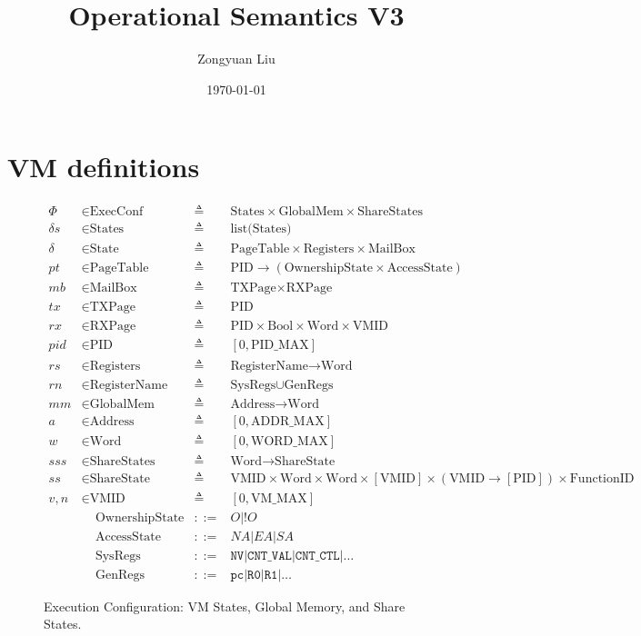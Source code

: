\documentclass[a4paper]{article}
\title{Operational Semantics V3} \date{\today}
\author{Zongyuan Liu}
\let\Oldsection\section
\renewcommand{\section}{\FloatBarrier\Oldsection}
\newcommand*{\defined}{\triangleq}
\newcommand*{\maps}{\rightarrow}
\newcommand*{\derived}{::=}
\newcommand*{\CONF}{\text{ExecConf}}
\newcommand*{\STATE}{\text{State}}
\newcommand*{\MEM}{\text{GlobalMem}}
\newcommand*{\SSS}{\text{ShareStates}}
\newcommand*{\PID}{\text{PID}}
\newcommand*{\PT}{\text{PageTable}}
\newcommand*{\AS}{\text{AccessState}}
\newcommand*{\OS}{\text{OwnershipState}}
\newcommand*{\REGS}{\text{Registers}}
\newcommand*{\ADDR}{\text{Address}}
\newcommand*{\WORD}{\text{Word}}
\newcommand*{\VMID}{\text{VMID}}
\newcommand*{\REGNAMES}{\text{RegisterName}}
\newcommand*{\MB}{\text{MailBox}}
\newcommand*{\PAMAX}{\text{ADDR\_MAX}}
\newcommand*{\PPIDMAX}{\text{PID\_MAX}}
\newcommand*{\PWMAX}{\text{WORD\_MAX}}
\newcommand*{\PVMMAX}{\text{VM\_MAX}}
\begin{document}

\tableofcontents

\section{VM definitions}

\begin{figure}[!htb]
  \begin{align*}
    \Phi &\in \CONF &\defined &\text{States} \times \MEM \times \SSS \\
    \delta s &\in \text{States} &\defined &\text{list(States)} \\
    \delta &\in \STATE &\defined &\PT \times \REGS \times \MB \\
    pt & \in \PT & \defined & \PID \maps (\OS \times \AS) \\
    mb & \in \MB &\defined &\text{TXPage} \times  \text{RXPage}\\
    tx & \in \text{TXPage} &\defined &\PID\\
    rx & \in \text{RXPage} &\defined &\PID \times \text{Bool} \times \WORD \times \VMID \\
    pid & \in \PID &\defined  &[ 0, \PPIDMAX ] \\
    rs & \in \REGS &\defined  &\REGNAMES \maps \WORD \\
    rn & \in \REGNAMES &\defined &\text{SysRegs} \cup \text{GenRegs} \\
    mm & \in \MEM &\defined  &\ADDR \maps \WORD \\
    a & \in \ADDR &\defined  &[ 0, \PAMAX ] \\
    w & \in \WORD &\defined  &[ 0, \PWMAX ] \\
    sss & \in \SSS &\defined  &\WORD \maps \text{ShareState} \\
    ss & \in \text{ShareState} &\defined &\VMID \times \WORD \times \WORD \times [\VMID] \times (\VMID \maps [\PID]) \times \text{FunctionID}\\
    v,n & \in \VMID &\defined  &[ 0, \PVMMAX ] \\
      & \;\;\;\; \OS & \derived & O | !O \\
      & \;\;\;\; \AS & \derived & NA | EA | SA \\
      & \;\;\;\; \text{SysRegs} &\derived & \mathtt{NV} | \mathtt{CNT\_VAL} | \mathtt{CNT\_CTL} | \dots \\
         & \;\;\;\; \text{GenRegs} &\derived & \mathtt{pc} | \mathtt {R0} | \mathtt{R1} | \dots
  \end{align*}
  \caption{Execution Configuration: VM States, Global Memory, and Share States.}
\end{figure}
\end{document}
